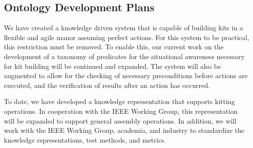 \subsection{Ontology Development Plans}
We have created a knowledge driven system that is capable of building
kits in a flexible and agile manor assuming perfect actions. For this system
to be practical, this restriction must be removed. 
To enable this, our current work on the development of a taxonomy of
predicates for the situational awareness necessary for kit building will
be continued and expanded. The system will also be augmented to
allow for the checking of necessary preconditions before actions are
executed, and the verification of results after an action has occurred.

To date, we have developed a knowledge representation that supports
kitting operations. In cooperation with the IEEE Working Group, this
representation will be expanded to support general assembly operations.
In addition, we will work with the IEEE Working Group, academia, and 
industry to standardize the knowledge representations, test methods,
and metrics.
